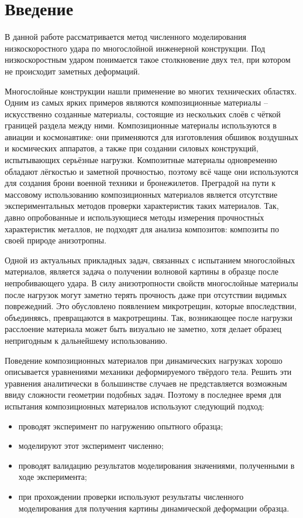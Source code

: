 \section*{Введение}
В данной работе рассматривается метод численного моделирования низкоскоростного
удара по многослойной инженерной конструкции. Под низкоскоростным ударом
понимается такое столкновение двух тел, при котором не происходит заметных
деформаций.

Многослойные конструкции нашли применение во многих технических областях. Одним
из самых ярких примеров являются композиционные материалы -- искусственно
созданные  материалы, состоящие из нескольких слоёв с чёткой границей раздела
между ними. Композиционные материалы используются в авиации и космонавтике: они
применяются для изготовления обшивок воздушных и космических аппаратов, а также
при создании силовых конструкций, испытывающих серьёзные нагрузки. Композитные
материалы одновременно обладают лёгкостью и заметной прочностью, поэтому всё
чаще они используются для создания брони военной техники и бронежилетов.
Преградой на пути к массовому использованию композиционных материалов является
отсутствие экспериментальных методов проверки характеристик таких материалов.
Так, давно опробованные и использующиеся методы измерения прочностн\'{ы}х
характеристик металлов, не подходят для анализа композитов: композиты по своей
природе анизотропны.

Одной из актуальных прикладных задач, связанных с испытанием многослойных
материалов, является задача о получении волновой картины в образце после
непробивающего удара. В силу анизотропности свойств многослойные материалы после
нагрузок могут заметно терять прочность даже при отсутствии видимых поврежедний.
Это обусловлено появлением микротрещин, которые впоследствии, объединяясь,
превращаются в макротрещины. Так, возникающее после нагрузки расслоение
материала может быть визуально не заметно, хотя делает образец непригодным к
дальнейшему использованию.

Поведение композиционных материалов при динамических нагрузках хорошо
описывается уравнениями механики деформируемого твёрдого тела. Решить эти
уравнения аналитически в большинстве случаев не представляется возможным ввиду
сложности геометрии подобных задач. Поэтому в последнее время для испытания
композиционных материалов используют следующий подход:
\begin{itemize}
\item проводят эксперимент по нагружению опытного образца;
\item моделируют этот эксперимент численно;
\item проводят валидацию результатов моделирования значениями, полученными в ходе эксперимента;
\item при прохождении проверки используют результаты численного моделирования
для получения картины динамической деформации образца.
\end{itemize}

